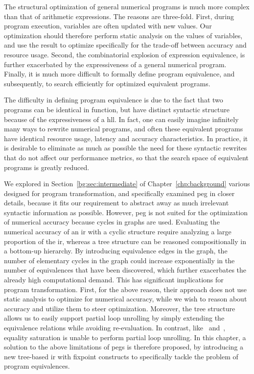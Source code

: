 The structural optimization of general numerical programs is much more complex
than that of arithmetic expressions.  The reasons are three-fold.  First,
during program execution, variables are often updated with new values.  Our
optimization should therefore perform static analysis on the values of
variables, and use the result to optimize specifically for the trade-off
between accuracy and resource usage.  Second, the combinatorial explosion of
expression equivalence, is further exacerbated by the expressiveness of a
general numerical program.  Finally, it is much more difficult to formally
define program equivalence, and subsequently, to search efficiently for
optimized equivalent programs.

The difficulty in defining program equivalence is due to the fact that two
programs can be identical in function, but have distinct syntactic structure
because of the expressiveness of a \gls{hll}\@.  In fact, one can easily
imagine infinitely many ways to rewrite numerical programs, and often these
equivalent programs have identical resource usage, latency and accuracy
characteristics.  In practice, it is desirable to eliminate as much as possible
the need for these syntactic rewrites that do not affect our performance
metrics, so that the search space of equivalent programs is greatly reduced.

We explored in Section~\ref{bg:sec:intermediate} of
Chapter~\ref{chp:background} various  designed for program
transformation, and specifically examined \acrfull{peg} in closer details,
because it fits our requirement to abstract away as much irrelevant syntactic
information as possible.  However, \gls{peg} is not suited for the optimization
of numerical accuracy because cycles in graphs are used.  Evaluating the
numerical accuracy of an \gls{ir} with a cyclic structure require analyzing
a large proportion of the \gls{ir}, whereas a tree structure can be reasoned
compositionally in a bottom-up hierarchy.  By introducing equivalence edges
in the graph, the number of elementary cycles in the graph could increase
exponentially in the number of equivalences that have been discovered,
which further exacerbates the already high computational demand.  This has
significant implications for program transformation.  First, for the above
reason, their approach does not use static analysis to optimize for numerical
accuracy, while we wish to reason about accuracy and utilize them to steer
optimization.  Moreover, the tree structure allows us to easily support partial
loop unrolling by simply extending the equivalence relations while avoiding
re-evaluation.  In contrast, like~\cite{martel09} and~\cite{damouche15},
equality saturation is unable to perform partial loop unrolling.  In this
chapter, a solution to the above limitations of \glspl{peg} is therefore
proposed, by introducing a new tree-based \gls{ir} with fixpoint constructs to
specifically tackle the problem of program equivalences.

